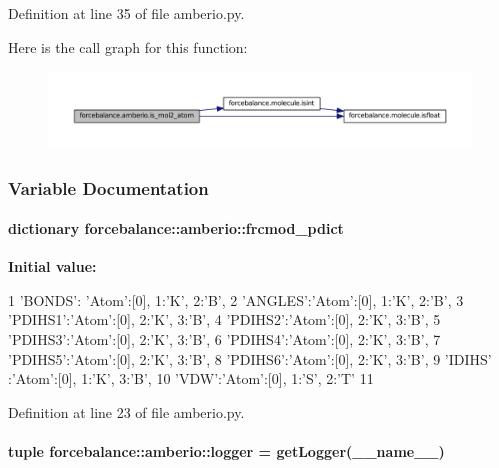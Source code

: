 \-Definition at line 35 of file amberio.\-py.



\-Here is the call graph for this function\-:\nopagebreak
\begin{figure}[H]
\begin{center}
\leavevmode
\includegraphics[width=350pt]{namespaceforcebalance_1_1amberio_af59589a24e815a11db69dcaa21c51659_cgraph}
\end{center}
\end{figure}




\subsubsection{\-Variable \-Documentation}
\hypertarget{namespaceforcebalance_1_1amberio_ae5ba6128e5e02a120e8bcd688a5b1be4}{
\paragraph[{frcmod\-\_\-pdict}]{\setlength{\rightskip}{0pt plus 5cm}dictionary {\bf forcebalance\-::amberio\-::frcmod\-\_\-pdict}}}\label{namespaceforcebalance_1_1amberio_ae5ba6128e5e02a120e8bcd688a5b1be4}
{\bfseries \-Initial value\-:}
\begin{DoxyCode}
1 {'BONDS': {'Atom':[0], 1:'K', 2:'B'},
2                 'ANGLES':{'Atom':[0], 1:'K', 2:'B'},
3                 'PDIHS1':{'Atom':[0], 2:'K', 3:'B'},
4                 'PDIHS2':{'Atom':[0], 2:'K', 3:'B'},
5                 'PDIHS3':{'Atom':[0], 2:'K', 3:'B'},
6                 'PDIHS4':{'Atom':[0], 2:'K', 3:'B'},
7                 'PDIHS5':{'Atom':[0], 2:'K', 3:'B'},
8                 'PDIHS6':{'Atom':[0], 2:'K', 3:'B'},
9                 'IDIHS' :{'Atom':[0], 1:'K', 3:'B'},
10                 'VDW':{'Atom':[0], 1:'S', 2:'T'}
11                 }
\end{DoxyCode}


\-Definition at line 23 of file amberio.\-py.

\hypertarget{namespaceforcebalance_1_1amberio_aa9ff86ae6726b8e8fc8b27ddf29e095a}{
\paragraph[{logger}]{\setlength{\rightskip}{0pt plus 5cm}tuple {\bf forcebalance\-::amberio\-::logger} = get\-Logger(\-\_\-\-\_\-name\-\_\-\-\_\-)}}\label{namespaceforcebalance_1_1amberio_aa9ff86ae6726b8e8fc8b27ddf29e095a}


